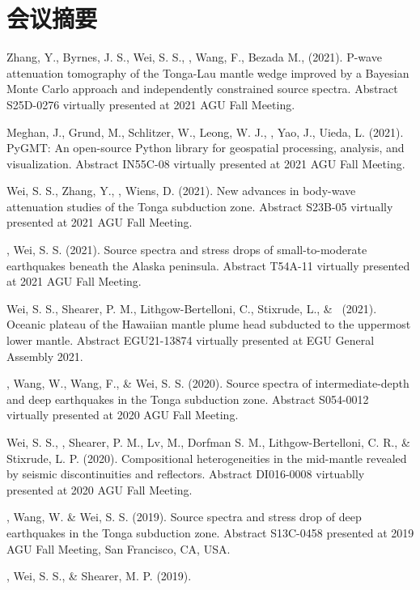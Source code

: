 \section{会议摘要}

\begin{etaremune}
\item Zhang, Y., Byrnes, J. S., Wei, S. S., \Tian, Wang, F., Bezada M., (2021).
    P-wave attenuation tomography of the Tonga-Lau mantle wedge improved
    by a Bayesian Monte Carlo approach and independently constrained source spectra.
    Abstract S25D-0276 virtually presented at 2021 AGU Fall Meeting.
\item Meghan, J., Grund, M., Schlitzer, W., Leong, W. J., \Tian, Yao, J., Uieda, L. (2021).
    PyGMT: An open-source Python library for geospatial processing, analysis, and visualization.
    Abstract IN55C-08 virtually presented at 2021 AGU Fall Meeting.
\item Wei, S. S., Zhang, Y., \Tian, Wiens, D. (2021).
    New advances in body-wave attenuation studies of the Tonga subduction zone.
    Abstract S23B-05 virtually presented at 2021 AGU Fall Meeting.
\item \Tian, Wei, S. S. (2021).
    Source spectra and stress drops of small-to-moderate earthquakes beneath the Alaska peninsula.
    Abstract T54A-11 virtually presented at 2021 AGU Fall Meeting.
\item Wei, S. S., Shearer, P. M., Lithgow-Bertelloni, C., Stixrude, L., \& \Tian\ (2021).
	Oceanic plateau of the Hawaiian mantle plume head subducted to the uppermost lower mantle.
	Abstract EGU21-13874 virtually presented at EGU General Assembly 2021.
\item \Tian, Wang, W., Wang, F., \& Wei, S. S. (2020).
	Source spectra of intermediate-depth and deep earthquakes in the Tonga subduction zone.
	Abstract S054-0012 virtually presented at 2020 AGU Fall Meeting.
\item Wei, S. S., \Tian, Shearer, P. M., Lv, M., Dorfman S. M., Lithgow-Bertelloni, C. R., \& Stixrude, L. P. (2020).
	Compositional heterogeneities in the mid-mantle revealed by seismic discontinuities and reflectors.
	Abstract DI016-0008 virtuablly presented at 2020 AGU Fall Meeting.
\item \Tian, Wang, W. \& Wei, S. S. (2019).
	Source spectra and stress drop of deep earthquakes in the Tonga subduction zone.
	Abstract S13C-0458 presented at 2019 AGU Fall Meeting, San Francisco, CA, USA.
\item
    \Tian, Wei, S. S., \& Shearer, M. P. (2019).

\end{etaremune}
